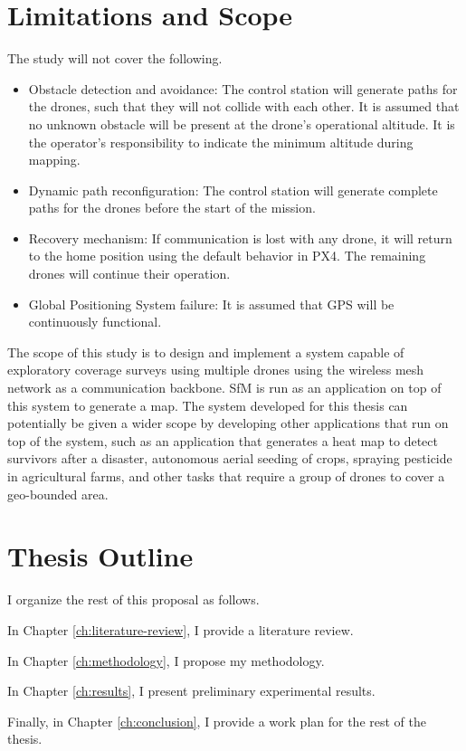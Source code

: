 \section{Limitations and Scope}

The study will not cover the following.
\begin{itemize}
	\item Obstacle detection and avoidance: The control station will generate paths for the drones, such that they will not collide with each other. It is assumed that no unknown obstacle will be present at the drone's operational altitude. It is the operator's responsibility to indicate the minimum altitude during mapping.
	
	\item Dynamic path reconfiguration: The control station will generate complete paths for the drones before the start of the mission.
	 
	\item Recovery mechanism: If communication is lost with any drone, it will return to the home position using the default behavior in PX4. The remaining drones will continue their operation.
	
	\item Global Positioning System failure: It is assumed that GPS will be continuously functional.
\end{itemize}

The scope of this study is to design and implement a system capable of exploratory coverage surveys using multiple drones using the wireless mesh network as a communication backbone. SfM is run as an application on top of this system to generate a map. The system developed for this thesis can potentially be given a wider scope by developing other applications that run on top of the system, such as an application that generates a heat map to detect survivors after a disaster, autonomous aerial seeding of crops, spraying pesticide in agricultural farms,  and other tasks that require a group of drones to cover a geo-bounded area. 


\section{Thesis Outline}

I organize the rest of this proposal as follows.

In Chapter \ref{ch:literature-review}, I provide a literature review.

In Chapter \ref{ch:methodology}, I propose my methodology.

In Chapter \ref{ch:results}, I present preliminary experimental results.

Finally, in Chapter \ref{ch:conclusion}, I provide a work plan for the rest of the thesis.

\FloatBarrier
